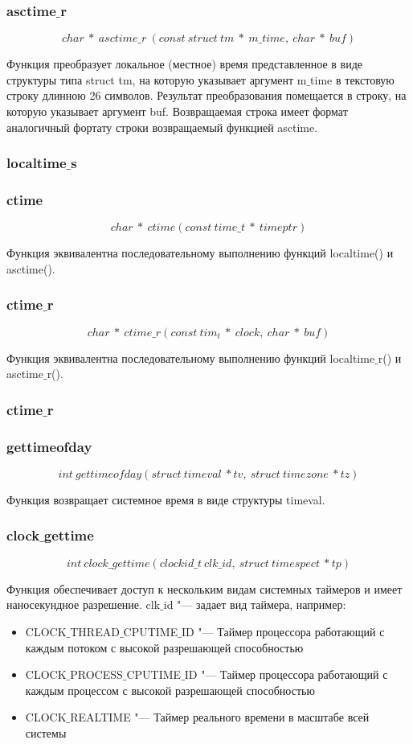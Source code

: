 \documentclass{article}
\begin{document}
			\subsubsection*{asctime$\_$r}			
			$$char~*~asctime\_r~(const~struct~tm~*~m\_time,~char~*~buf)$$			
			
				Функция преобразует локальное (местное) время представленное в виде структуры типа struct tm, на которую 						указывает аргумент m$\_$time в текстовую строку длинною 26 символов. Результат преобразования помещается в строку, на 			которую указывает аргумент buf. Возвращаемая строка имеет формат аналогичный фортату строки возвращаемый функцией 					asctime.
			
			\subsubsection*{localtime$\_$s}		
			\subsubsection*{ctime}
				$$char~*~ctime(const~time\_t~ *~ timeptr)$$
				
				Функция эквивалентна последовательному выполнению функций localtime() и asctime().
			\subsubsection*{ctime$\_$r}				
				$$char~*~ctime\_r(const~tim_t~*~clock,~char~*~buf)$$

				Функция эквивалентна последовательному выполнению функций localtime$\_$r() и asctime$\_$r().
			\subsubsection*{ctime$\_$r}
			\subsubsection*{gettimeofday}
			$$int~gettimeofday(struct~timeval~*tv,~struct~timezone~*tz)$$ 
			
				Функция возвращает системное время в виде структуры timeval.
			\subsubsection*{clock$\_$gettime}
			$$int~clock\_gettime(clockid\_t~clk\_id,~struct~timespect~*tp)$$
			
				Функция обеспечивает доступ к нескольким видам системных таймеров и имеет наносекундное разрешение. 
			clk$\_$id  "--- задает вид таймера, например:
			\begin{itemize}
				\item CLOCK$\_$THREAD$\_$CPUTIME$\_$ID "---	Таймер процессора работающий с каждым потоком с высокой разрешающей 						способностью		
				\item CLOCK$\_$PROCESS$\_$CPUTIME$\_$ID "---	Таймер процессора работающий с каждым процессом с высокой 								разрешающей способностью
				\item CLOCK$\_$REALTIME "--- Таймер реального времени в масштабе всей системы
			\end{itemize}	
\end{document}
